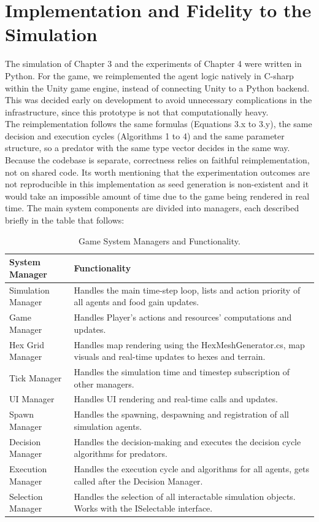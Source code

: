 \documentclass[12pt,a4paper]{report}
\renewcommand{\arraystretch}{1.2}
\begin{document}
	
	\section{Implementation and Fidelity to the Simulation}

    The simulation of Chapter 3 and the experiments of Chapter 4 were written in Python. For the game, we reimplemented the agent logic natively in C-sharp within the Unity game engine, instead of connecting Unity to a Python backend. This was decided early on development to avoid unnecessary complications in the infrastructure, since this prototype is not that computationally heavy. \\

	The reimplementation follows the same formulas (Equations 3.x to 3.y), the same decision and execution cycles (Algorithms 1 to 4) and the same parameter structure, so a predator with the same type vector decides in the same way. Because the codebase is separate, correctness relies on faithful reimplementation, not on shared code. Its worth mentioning that the experimentation outcomes are not reproducible in this implementation as seed generation is non-existent and it would take an impossible amount of time due to the game being rendered in real time. The main system components are divided into managers, each described briefly in the table that follows: \\

	\begin{table}[H]
		\centering
		\renewcommand{\arraystretch}{1.5}
		\begin{tabular}{|l|p{}|}
			\hline
			System Manager & Functionality \\
			\hline
            Simulation Manager & Handles the main time-step loop, lists and action priority of all agents and food gain updates. \\
			Game Manager &  Handles Player's actions and resources' computations and updates. \\
			Hex Grid Manager & Handles map rendering using the HexMeshGenerator.cs, map visuals and real-time updates to hexes and terrain. \\
			Tick Manager & Handles the simulation time and timestep subscription of other managers. \\
			UI Manager & Handles UI rendering and real-time calls and updates. \\
			Spawn Manager & Handles the spawning, despawning and registration of all simulation agents. \\
			Decision Manager & Handles the decision-making and executes the decision cycle algorithms for predators. \\
			Execution Manager & Handles the execution cycle and algorithms for all agents, gets called after the Decision Manager. \\
			Selection Manager & Handles the selection of all interactable simulation objects. Works with the ISelectable interface. \\
			\hline
		\end{tabular}
		\caption{Game System Managers and Functionality.}
	\end{table}
\end{document}
